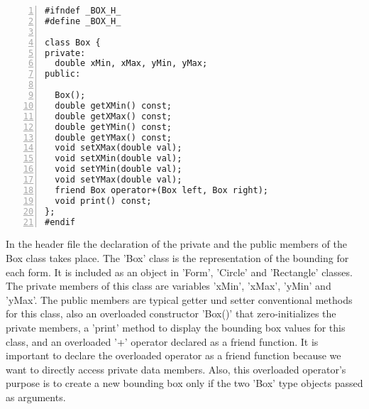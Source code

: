 \documentclass{article}
\begin{document}
\begin{lstlisting}[basicstyle=\footnotesize\ttfamily, numbers=left, stepnumber=1, numberstyle = \normalsize]
#ifndef _BOX_H_
#define _BOX_H_

class Box {
private:
  double xMin, xMax, yMin, yMax;
public:

  Box();
  double getXMin() const;
  double getXMax() const;
  double getYMin() const;
  double getYMax() const;
  void setXMax(double val);
  void setXMin(double val);
  void setYMin(double val);
  void setYMax(double val);
  friend Box operator+(Box left, Box right);
  void print() const;
};
#endif
\end{lstlisting}
\normalsize{In the header file the declaration of the private and the public members of the Box class takes place.\newline
  \newline
  The 'Box' class is the representation of the bounding for each form. It is included as an object in 'Form', 'Circle' and 'Rectangle' classes.
  The private members of this class are variables 'xMin', 'xMax', 'yMin' and 'yMax'.
  The public members are typical getter und setter conventional methods for this class, also an overloaded constructor 'Box()' that zero-initializes the private members, a 'print' method to display the bounding box values for this class, and an overloaded '+' operator declared as a friend function. It is important to declare the overloaded operator as a friend function because we want to directly access private data members.
  Also, this overloaded operator's purpose is to create a new bounding box only if the two 'Box' type objects passed as arguments.

}\newpage
\end{document}
